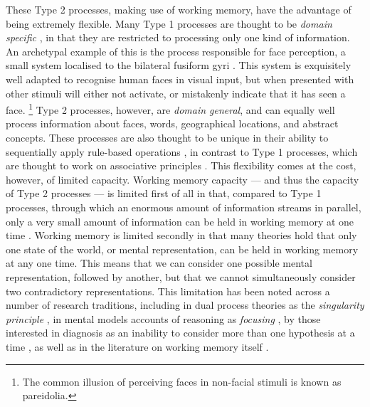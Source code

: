 These Type 2 processes,
making use of working memory,
have the advantage of being extremely flexible.
Many Type 1 processes are thought to be \emph{domain specific} \citep[see][]{Cosmides1994a},
in that they are restricted to processing only one kind of information.
An archetypal example of this is the process responsible for face perception,
a small system localised to the bilateral fusiform gyri
\citep[or \emph{fusiform face areas; }see][]{Kanwisher1997}.
This system is exquisitely well adapted to recognise human faces in visual input,
but when presented with other stimuli will either not activate,
or mistakenly indicate that it has seen a face.%
\footnote{
  The common illusion of perceiving faces
  in non-facial stimuli is known as pareidolia.}
Type 2 processes, however, are \emph{domain general},
and can equally well process information about faces, words,
geographical locations, and abstract concepts.
These processes are also thought to be unique
in their ability to sequentially apply rule-based operations
\citep{Cooper1973,Anderson2014,Anderson1996a},
in contrast to Type 1 processes, which are thought to
work on associative principles \citep[see][]{Sloman1996}.
This flexibility comes at the cost, however, of limited capacity.
Working memory capacity
--- and thus the capacity of Type 2 processes ---
is limited first of all in that, compared to Type 1 processes,
through which an enormous amount of information streams in parallel,
only a very small amount of information can be held
in working memory at one time
\citep[famously 7 chunks of information, $\pm$ 2, according to][]{Miller1956}.
Working memory is limited secondly in that
many theories hold that only one state of the world,
or mental representation,
can be held in working memory at any one time.
This means that we can consider one possible mental representation,
followed by another, but that we cannot simultaneously consider
two contradictory representations.
This limitation has been noted across a number of research traditions,
including in dual process theories as the
\emph{singularity principle} \citep{Evans1984,Evans2006},
in mental models accounts of reasoning \citep{Johnson-Laird1983}
as \emph{focusing} \citep{Legrenzi1993},
by those interested in diagnosis as an inability to
consider more than one hypothesis at a time \citep{Mynatt1993},
as well as in the literature on working memory itself \citep{Baddeley2007}.

